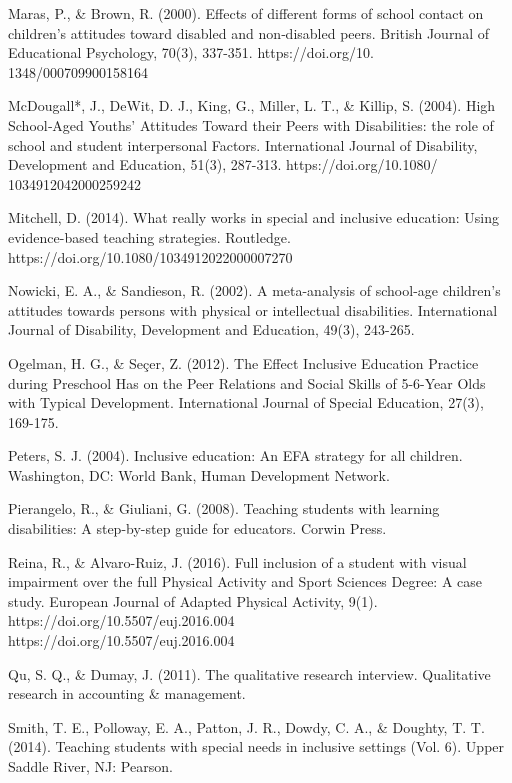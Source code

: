 \documentclass[11pt]{sig-alternate}
\begin{document}
\begin{large}
{Maras, P., \& Brown, R. (2000). Effects of different forms of school contact on children's attitudes toward disabled and non‐disabled peers. British Journal of Educational Psychology, 70(3), 337-351.‏ https://doi.org/10.\\1348/000709900158164 

McDougall*, J., DeWit, D. J., King, G., Miller, L. T., \& Killip, S. (2004). High School‐Aged Youths' Attitudes Toward their Peers with Disabilities: the role of school and student interpersonal Factors. International Journal of Disability, Development and Education, 51(3), 287-313.‏ https://doi.org/10.1080/\\1034912042000259242 

Mitchell, D. (2014). What really works in special and inclusive education: Using evidence-based teaching strategies. Routledge.‏ \\https://doi.org/10.1080/1034912022000007270 

Nowicki, E. A., \& Sandieson, R. (2002). A meta-analysis of school-age children's attitudes towards persons with physical or intellectual disabilities. International Journal of Disability, Development and Education, 49(3), 243-265.‏

Ogelman, H. G., \& Seçer, Z. (2012). The Effect Inclusive Education Practice during Preschool Has on the Peer Relations and Social Skills of 5-6-Year Olds with Typical Development. International Journal of Special Education, 27(3), 169-175.‏

Peters, S. J. (2004). Inclusive education: An EFA strategy for all children. Washington, DC: World Bank, Human Development Network.‏

Pierangelo, R., \& Giuliani, G. (2008). Teaching students with learning disabilities: A step-by-step guide for educators. Corwin Press.‏

Reina, R., \& Alvaro-Ruiz, J. (2016). Full inclusion of a student with visual impairment over the full Physical Activity and Sport Sciences Degree: A case study. European Journal of Adapted Physical Activity, 9(1).‏ https://doi.org/10.5507/euj.2016.004\\ https://doi.org/10.5507/euj.2016.004

Qu, S. Q., \& Dumay, J. (2011). The qualitative research interview. Qualitative research in accounting \& management.‏ 

Smith, T. E., Polloway, E. A., Patton, J. R., Dowdy, C. A., \& Doughty, T. T. (2014). Teaching students with special needs in inclusive settings (Vol. 6). Upper Saddle River, NJ: Pearson.‏

}
\end{large}
\end{document}
